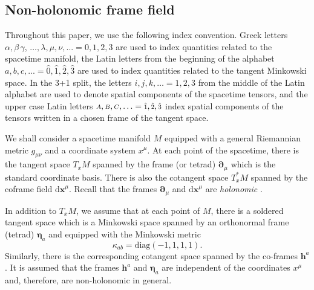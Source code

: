 \documentclass[
10pt, %
a4paper, %
oneside, %
twocolumn,
headinclude,footinclude, %
BCOR5mm, %
]{scrartcl}
\newcommand{\sA}{\mathsmaller A}
\newcommand{\sB}{\mathsmaller B}
\newcommand{\sC}{\mathsmaller C}
\newcommand{\mg}[1]{\kappa_{#1}}			%
\newcommand{\pdd}[1]{{\bm{\partial}_{#1}}}
\newcommand{\dx}[1]{{\bm{\mathrm{d}x}^{#1}}}
\newcommand{\tetrsymbol}{h}
\newcommand{\itetrsymbol}{\eta}
\newcommand{\cobas}[1]{\bm{\tetrsymbol}^{#1}}
\newcommand{\bas}[1]{\bm{\itetrsymbol}_{#1}}
\newcommand{\indalg}[1]{\hat{\mathsmaller{#1}}}
\newcommand{\ho}[1]{\textcolor{magenta}{HO: #1}}
\begin{document}
	\subsection{Non-holonomic frame field}
	
	Throughout this paper, we use the following index convention. Greek letters $ \alpha, 
	\beta\,\gamma$, 
	$\ldots, \lambda,\mu,\nu,... 
	=0,1,2,3
	$ are used to index quantities related to the spacetime manifold, the Latin letters from the 
	beginning of the alphabet $ a,b,c,... 
	=\hat{0},\hat{1},\hat{2},\hat{3}$ are used to index quantities related to the tangent Minkowski 
	space.
	In the 3+1 split, the letters $ i,j,k,\ldots =1,2,3$ from the middle of the Latin alphabet 
	are 
	used 
	to denote spatial components of the spacetime tensors, and the upper case Latin letters $ 
	\sA,\sB,\sC,\ldots=\indalg{1},\indalg{2},\indalg{3} $ index spatial components of the tensors 
	written in a chosen frame of the 
	tangent space.
	
	
	
	We shall consider a spacetime manifold $ M $ equipped with a general Riemannian metric $ 
	g_{\mu\nu} 
	$ and a coordinate system $ x^\mu $. At each 
	point of 
	the spacetime, there is the tangent space $ T_{x}M $ spanned by the frame (or tetrad) $ 
	\pdd{\mu} $ which is the standard coordinate basis. 
	There is also the cotangent space $ T_x^*M $ spanned by the coframe field $ \dx{\mu} $. 
	Recall that the frames $ \pdd{\mu} $ and $ \dx{\mu} $ are \emph{holonomic} 
	\cite{AldrovandiPereiraBook}.
	
	
	In addition to $ T_{x}M $, we assume that at each point of $ M $, there is a soldered tangent 
	space 
	which is a Minkowski space spanned by an orthonormal frame (tetrad) $ \bas{a} $ and equipped 
	with 
	the 
	Minkowski metric 
	\begin{equation}\label{eqn.mg}
		\mg{ab} = \text{diag}(-1,1,1,1).
	\end{equation}
	Similarly, there is the 
	corresponding cotangent space spanned by the co-frames $ \cobas{a} $. It is assumed 
	that the frames $ \cobas{a} $ and $ \bas{a} $ are independent of the coordinates $ x^\mu $ and, 
	therefore, are non-holonomic in general.
	
\end{document}
